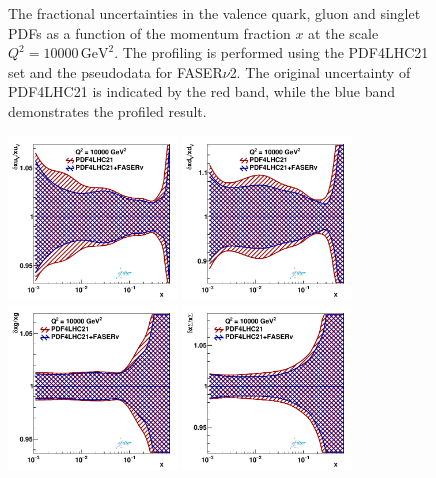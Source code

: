 \documentclass[11pt,a4paper]{article}
\numberwithin{equation}{section}
\numberwithin{figure}{section}
\numberwithin{table}{section}
\begin{document}
\begin{figure}[H]
\caption{The fractional uncertainties in the valence quark, gluon and singlet PDFs as a function of the momentum fraction $x$ at the scale $Q^2 = 10000 \, \textrm{GeV}^2$. The profiling is performed using the
PDF4LHC21 set and the pseudodata for FASER$\nu$2. The original uncertainty of PDF4LHC21 is
indicated by the red band, while the blue band demonstrates the profiled result.}
\label{FASERv2_profiling}
\end{figure}

\begin{figure}[H]
\centering
\includegraphics[width=0.4\textwidth]{./figs_xFitter/FASERv_q2_10000_pdf_uv_ratio.pdf}
\includegraphics[width=0.4\textwidth]{./figs_xFitter/FASERv_q2_10000_pdf_dv_ratio.pdf}\\
\includegraphics[width=0.4\textwidth]{./figs_xFitter/FASERv_q2_10000_pdf_g_ratio.pdf}
\includegraphics[width=0.4\textwidth]{./figs_xFitter/FASERv_q2_10000_pdf_Sea_ratio.pdf}

\end{figure}
\end{document}

